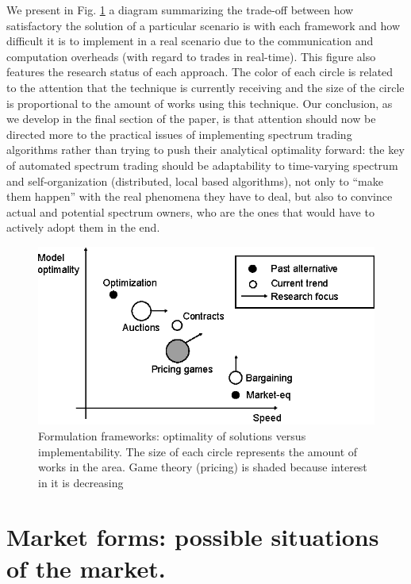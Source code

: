 We present in Fig. \ref{fig:frameworks} a diagram summarizing the trade-off between how satisfactory the solution of a particular scenario is with each framework and how difficult it is to implement in a real scenario due to the communication and computation overheads (with regard to trades in real-time). 
This figure also features the research status of each approach. 
The color of each circle is related to the attention that the technique is currently receiving and the size of the circle is proportional to the amount of works using this technique.
Our conclusion, as we develop in the final section of the paper, is that attention should now be directed more to the practical issues of implementing spectrum trading algorithms rather than trying to push their analytical optimality forward: the key of automated spectrum trading should be adaptability to time-varying spectrum and self-organization (distributed, local based algorithms), not only to ``make them happen'' with the real phenomena they have to deal, but also to convince actual and potential spectrum owners, who are the ones that would have to actively adopt them in the end. 

\begin{figure}[!ht]
  \begin{center}
  \includegraphics[scale=1]{Fig4.eps}
  \end{center}
  \caption{Formulation frameworks: optimality of solutions versus implementability. The size of each circle represents the amount of works in the area. Game theory (pricing) is shaded because interest in it is decreasing}
   \label{fig:frameworks}
\end{figure}

\section{Market forms: possible situations of the market.}\label{sec:Market}

